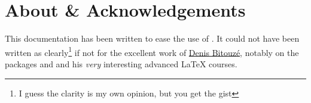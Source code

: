 \section{About \& Acknowledgements}
\label{sec:about}

This documentation has been written to ease the use of . %
It could not have been written as clearly\footnote{I guess the clarity is my own
  opinion, but you get the gist} if not for the excellent work of
\href{https://ctan.org/author/bitouze}{Denis Bitouzé}, notably on the
packages  and  and his \emph{very} interesting
advanced \LaTeX{} courses. %

